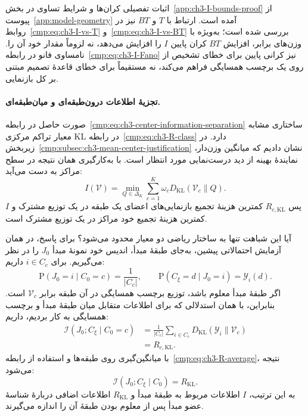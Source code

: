 اثبات تفصیلی کران‌ها و شرایط تساوی در
بخش~\ref{app:ch3-I-bounds-proof} از
پیوست~\ref{app:model-geometry} آمده است.
ارتباط با $T$ و $BT$ نیز در
روابط~\eqref{cmp:eq:ch3-I-vs-T}
و~\eqref{cmp:eq:ch3-I-vs-BT} بررسی شده است؛
به‌ویژه با وزن‌های برابر، افزایش $BT$ کران
پایین $I$ را افزایش می‌دهد، نه لزوماً مقدار
خود آن را. نامساوی فانو در
رابطه~\eqref{cmp:eq:ch3-I-Fano} نیز کرانی
پایین برای خطای تشخیص از روی یک برچسب
همسایگی فراهم می‌کند، نه مستقیماً برای خطای
قاعدهٔ تصمیم مبتنی بر کل بازنمایی.

\paragraph{تجزیهٔ اطلاعات درون‌طبقه‌ای و میان‌طبقه‌ای.}
صورت حاصل در
رابطه~\eqref{cmp:eq:ch3-center-information-separation}
ساختاری مشابه معیار تراکم مرکزی KL در
رابطه~\eqref{cmp:eq:ch3-R-class} دارد. در
زیربخش~\ref{cmp:subsec:ch3-mean-center-justification}
نشان دادیم که میانگین وزن‌دار، نمایندهٔ بهینه
از دید درست‌نمایی مورد انتظار است. با به‌کارگیری
همان نتیجه در سطح مراکز به دست می‌آید:
\[
I(\mathcal V)=\min_{Q\in\Delta_K}
\sum_{c=1}^{K}\omega_c D_{\mathrm{KL}}(\mathcal V_c\|Q).
\]
پس $R_{c,\mathrm{KL}}$ کمترین هزینهٔ تجمیع
بازنمایی‌های اعضای یک طبقه در یک توزیع مشترک
و $I$ کمترین هزینهٔ تجمیع خود مراکز در یک
توزیع مشترک است.

آیا این شباهت تنها به ساختار ریاضی دو معیار
محدود می‌شود؟ برای پاسخ، در همان آزمایش
احتمالاتی پیشین، به‌جای طبقهٔ مبدأ، اندیس
خود نمونهٔ مبدأ $J_0$ را در نظر می‌گیریم.
برای $i\in C_c$ داریم:
\[
\mathrm P(J_0=i\mid C_0=c)=\frac{1}{|C_c|},
\qquad
\mathrm P(C_\xi=d\mid J_0=i)=\mathscr Y_i(d).
\]
اگر طبقهٔ مبدأ معلوم باشد، توزیع برچسب
همسایگی در آن طبقه برابر $\mathcal V_c$
است. بنابراین، با همان استدلالی که برای
اطلاعات متقابل میان طبقهٔ مبدأ و برچسب
همسایگی به کار بردیم، داریم:
\[
\begin{aligned}
\mathcal I(J_0;C_\xi\mid C_0=c)
&=\frac{1}{|C_c|}\sum_{i\in C_c}
D_{\mathrm{KL}}(\mathscr Y_i\|\mathcal V_c)\\
&=R_{c,\mathrm{KL}}.
\end{aligned}
\]
با میانگین‌گیری روی طبقه‌ها و استفاده از
رابطه~\eqref{cmp:eq:ch3-R-average}، نتیجه می‌شود:
\[
\mathcal I(J_0;C_\xi\mid C_0)=R_{\mathrm{KL}}.
\]
به این ترتیب، $I$ اطلاعات مربوط به طبقهٔ
مبدأ و $R_{\mathrm{KL}}$ اطلاعات اضافی
دربارهٔ شناسهٔ عضو مبدأ پس از معلوم بودن
طبقهٔ آن را اندازه می‌گیرند.

